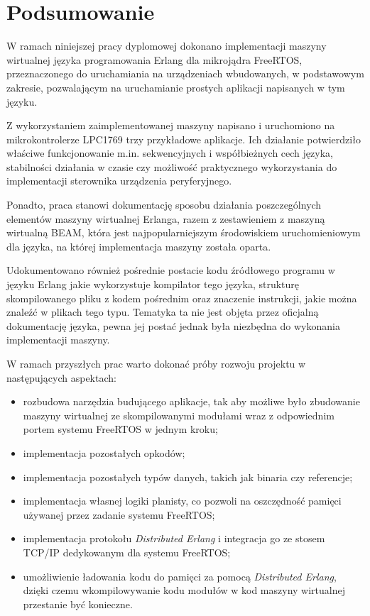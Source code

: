 \chapter{Podsumowanie}
\label{cha:podsumowanie}

W ramach niniejszej pracy dyplomowej dokonano implementacji maszyny wirtualnej języka programowania Erlang dla mikrojądra FreeRTOS, przeznaczonego do uruchamiania na urządzeniach wbudowanych, w podstawowym zakresie, pozwalającym na uruchamianie prostych aplikacji napisanych w tym języku.

Z wykorzystaniem zaimplementowanej maszyny napisano i uruchomiono na mikrokontrolerze LPC1769 trzy przykładowe aplikacje.
Ich działanie potwierdziło właściwe funkcjonowanie m.in. sekwencyjnych i współbieżnych cech języka, stabilności działania w czasie czy możliwość praktycznego wykorzystania do implementacji sterownika urządzenia peryferyjnego.

Ponadto, praca stanowi dokumentację sposobu działania poszczególnych elementów maszyny wirtualnej Erlanga, razem z zestawieniem z maszyną wirtualną BEAM, która jest najpopularniejszym środowiskiem uruchomieniowym dla języka, na której implementacja maszyny została oparta.

Udokumentowano również pośrednie postacie kodu źródłowego programu w języku Erlang jakie wykorzystuje kompilator tego języka, strukturę skompilowanego pliku z kodem pośrednim oraz znaczenie instrukcji, jakie można znaleźć w plikach tego typu.
Tematyka ta nie jest objęta przez oficjalną dokumentację języka, pewna jej postać jednak była niezbędna do wykonania implementacji maszyny. 

W ramach przyszłych prac warto dokonać próby rozwoju projektu w następujących aspektach:

\begin{itemize}
\item rozbudowa narzędzia budującego aplikacje, tak aby możliwe było zbudowanie maszyny wirtualnej ze skompilowanymi modułami wraz z odpowiednim portem systemu FreeRTOS w jednym kroku;
\item implementacja pozostałych opkodów;
\item implementacja pozostałych typów danych, takich jak binaria czy referencje;
\item implementacja własnej logiki planisty, co pozwoli na oszczędność pamięci używanej przez zadanie systemu FreeRTOS;
\item implementacja protokołu \emph{Distributed Erlang} \cite{DistributedErlang} i integracja go ze stosem TCP/IP dedykowanym dla systemu FreeRTOS;
\item umożliwienie ładowania kodu do pamięci za pomocą \emph{Distributed Erlang}, dzięki czemu wkompilowywanie kodu modułów w kod maszyny wirtualnej przestanie być konieczne.
\end{itemize}